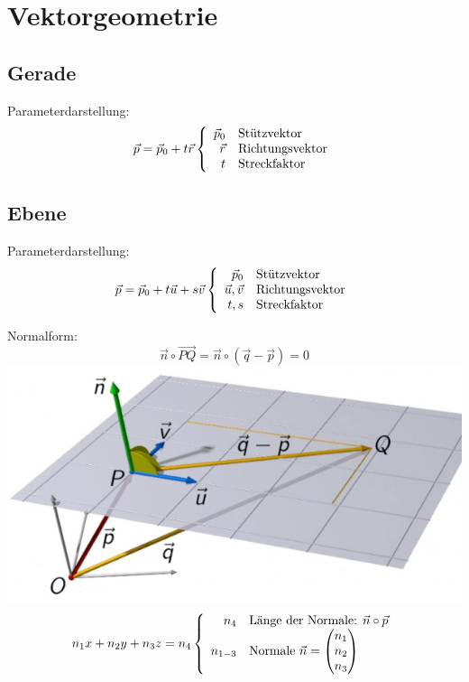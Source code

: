 \section{Vektorgeometrie}

\subsection{Gerade}
\noindent Parameterdarstellung: \[\vec{p} = \vec{p}_0 + t\vec{r} \left\lbrace 
	\begin{array}{r@{\quad}l}
		\vec{p}_0 & \text{Stützvektor}\\ 
		\vec{r}  & \text{Richtungsvektor} \\
		t & \text{Streckfaktor}
	\end{array}
\right. \]


\subsection{Ebene}
\noindent Parameterdarstellung: \[\vec{p} = \vec{p}_0 +  t\vec{u} + s\vec{v} \left\lbrace 
\begin{array}{r@{\quad}l}
	\vec{p}_0 & \text{Stützvektor} \\ 
	\vec{u},\vec{v}  & \text{Richtungsvektor} \\
	t,s & \text{Streckfaktor}
\end{array}
\right. \]

\noindent Normalform: \label{normalform}
\[
	\vec{n} \circ \vec{PQ} = \vec{n} \circ (\vec{q} - \vec{p}) = 0
\]
\includegraphics[width=\columnwidth]{./Images/Normalenform.png}
\[
	n_1x + n_2y + n_3z = n_4 \left\lbrace 
	\begin{array}{r@{\quad}l}
		n_4 & \text{Länge der Normale: } \vec{n} \circ \vec{p} \\ 
		n_{1-3} & \text{Normale } \vec{n} = \begin{pmatrix}n_1\\n_2\\n_3\end{pmatrix}
	\end{array}
	\right.
\]

